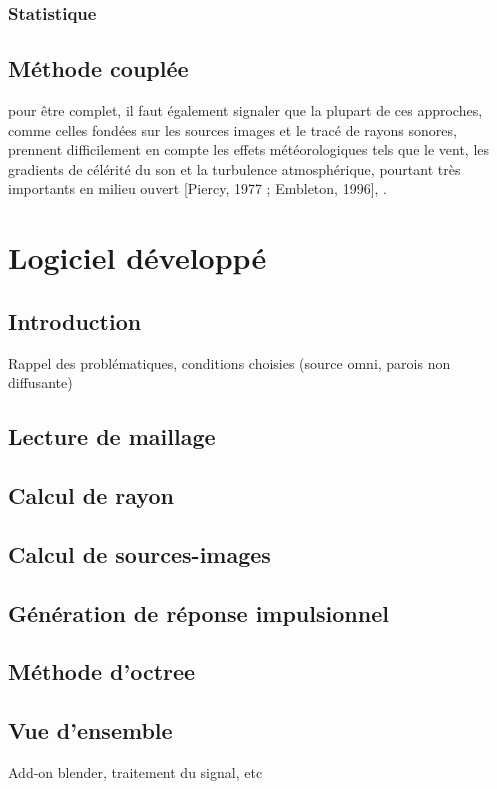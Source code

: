 	\subsection{Statistique}
\section{Méthode couplée}
pour être complet, il faut également signaler que la plupart de ces approches,
comme celles fondées sur les sources images et le tracé de rayons sonores, prennent difficilement en
compte les effets météorologiques tels que le vent, les gradients de célérité du son et la turbulence
atmosphérique, pourtant très importants en milieu ouvert [Piercy, 1977 ; Embleton, 1996], \cite{picaut}.

		
\chapter{Logiciel développé}
	\minitoc
	\newpage
	
\section{Introduction}
Rappel des problématiques, conditions choisies (source omni, parois non diffusante)
\section{Lecture de maillage}
\section{Calcul de rayon}
\section{Calcul de sources-images}
\section{Génération de réponse impulsionnel}
\section{Méthode d'octree}
\section{Vue d'ensemble}
Add-on blender, traitement du signal, etc

